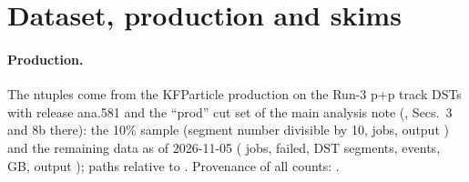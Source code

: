 \section{Dataset, production and skims}
\label{sec:dataset}

\paragraph{Production.} The \Dzero{} ntuples come from the KFParticle production on the Run-3 p+p track DSTs
with release ana.581 and the ``prod'' cut set of the main analysis note (, Secs.~3 and 8b there):
the 10\% sample (segment number divisible by 10, \tenDZfiles{} jobs, output ) and the remaining
data as of 2026-11-05 (\ninetyJobs{} jobs, \ninetyBad{} failed, \ninetySeg{} DST segments, \ninetyEvt{} events,
\ninetySize\,GB, output ); paths relative to .
Provenance of all counts: .

